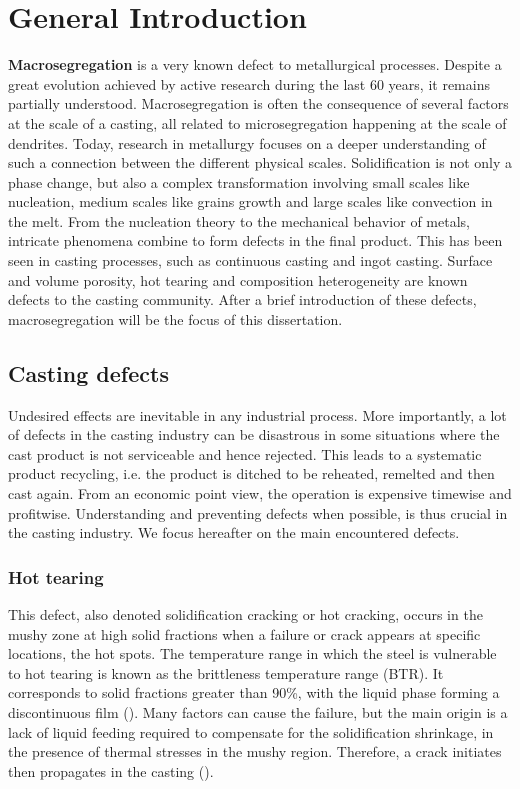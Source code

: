 \chapter*{General Introduction}

\textbf{Macrosegregation} is a very known defect to metallurgical processes. Despite a great evolution achieved by active research during the last 60 years,
it remains partially understood. Macrosegregation is often  the consequence of several factors at the scale of a casting, all related to microsegregation happening at the scale
of dendrites. Today, research in metallurgy focuses on a deeper understanding of such a connection between the different physical scales.
Solidification is not only a phase change, but also a complex transformation involving small scales like nucleation, medium scales
like grains growth and large scales like convection in the melt. From the nucleation theory to the mechanical behavior of metals, intricate phenomena combine to form defects in the final product. This has been seen in casting processes, such as continuous casting and ingot casting. Surface and volume porosity, hot tearing and composition heterogeneity are known defects to the casting community. After a brief introduction of these defects, macrosegregation will be the focus of this dissertation.

\section*{Casting defects}
Undesired effects are inevitable in any industrial process. More importantly, a lot of defects in the casting industry can be disastrous in some situations where the cast product is not serviceable and hence rejected. This leads to a systematic product recycling, i.e. the product is ditched to be reheated, remelted and then cast again. From an economic point view, the operation is expensive timewise and profitwise. Understanding and preventing defects when possible, is thus crucial in the casting industry.
We focus hereafter on the main encountered defects.

\subsection*{Hot tearing}
This defect, also denoted solidification cracking or hot cracking, occurs in the mushy zone at high solid fractions when a failure
or crack appears at specific locations, the hot spots. The temperature range in which the steel is vulnerable to hot tearing is known as the brittleness temperature range (BTR). It corresponds to solid fractions greater than \num{90}\%, with the liquid phase forming a discontinuous film (). Many factors can cause the failure, but the main origin is a lack of liquid feeding required to compensate for the solidification shrinkage, in the presence of thermal stresses in the mushy region. Therefore, a crack initiates then propagates in the casting (). 

